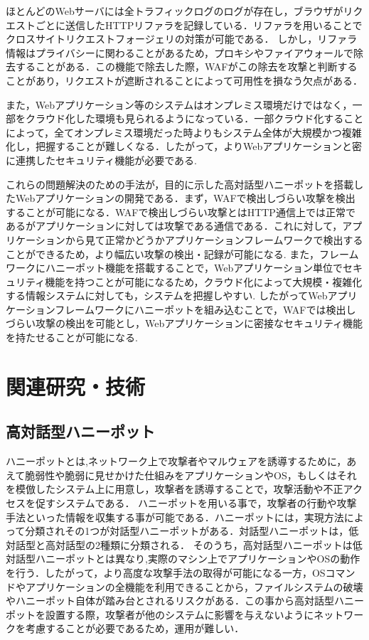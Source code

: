 \documentclass{css}
\begin{document}
ほとんどのWebサーバには全トラフィックログのログが存在し，ブラウザがリクエストごとに送信したHTTPリファラを記録している．リファラを用いることでクロスサイトリクエストフォージェリの対策が可能である．
しかし，リファラ情報はプライバシーに関わることがあるため，プロキシやファイアウォールで除去することがある．この機能で除去した際，WAFがこの除去を攻撃と判断することがあり，リクエストが遮断されることによって可用性を損なう欠点がある．
\par
また，Webアプリケーション等のシステムはオンプレミス環境だけではなく，一部をクラウド化した環境も見られるようになっている．一部クラウド化することによって，全てオンプレミス環境だった時よりもシステム全体が大規模かつ複雑化し，把握することが難しくなる．したがって，よりWebアプリケーションと密に連携したセキュリティ機能が必要である.\par
これらの問題解決のための手法が，目的に示した高対話型ハニーポットを搭載したWebアプリケーションの開発である．まず，WAFで検出しづらい攻撃を検出することが可能になる．WAFで検出しづらい攻撃とはHTTP通信上では正常であるがアプリケーションに対しては攻撃である通信である．これに対して，アプリケーションから見て正常かどうかアプリケーションフレームワークで検出することができるため，より幅広い攻撃の検出・記録が可能になる.
また，フレームワークにハニーポット機能を搭載することで，Webアプリケーション単位でセキュリティ機能を持つことが可能になるため，クラウド化によって大規模・複雑化する情報システムに対しても，システムを把握しやすい.
したがってWebアプリケーションフレームワークにハニーポットを組み込むことで，WAFでは検出しづらい攻撃の検出を可能とし，Webアプリケーションに密接なセキュリティ機能を持たせることが可能になる.


\section{関連研究・技術}
\subsection{高対話型ハニーポット}
ハニーポット\cite{honeypot}とは,ネットワーク上で攻撃者やマルウェアを誘導するために，あえて脆弱性や脆弱に見せかけた仕組みをアプリケーションやOS，もしくはそれを模倣したシステム上に用意し，攻撃者を誘導することで，攻撃活動や不正アクセスを促すシステムである．
ハニーポットを用いる事で，攻撃者の行動や攻撃手法といった情報を収集する事が可能である．ハニーポットには，実現方法によって分類されその1つが対話型ハニーポットがある．対話型ハニーポットは，低対話型と高対話型の2種類に分類される．
そのうち，高対話型ハニーポットは低対話型ハニーポットとは異なり,実際のマシン上でアプリケーションやOSの動作を行う．したがって，より高度な攻撃手法の取得が可能になる一方，OSコマンドやアプリケーションの全機能を利用できることから，ファイルシステムの破壊やハニーポット自体が踏み台とされるリスクがある．この事から高対話型ハニーポットを設置する際，攻撃者が他のシステムに影響を与えないようにネットワークを考慮することが必要であるため，運用が難しい．
\end{document}
